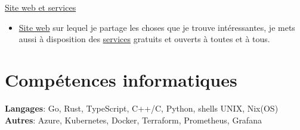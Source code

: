 \documentclass[margin,line]{../res}
\begin{document}
\begin{resume}
	\href{https://github.com/theobori-cafe}{Site web et services}
	\begin{itemize}
		\item \href{https://theobori.cafe}{Site web} sur lequel je partage les choses que je trouve intéressantes, je mets aussi à disposition des \href{https://services.theobori.cafe}{services} gratuits et ouverts à toutes et à tous.
	\end{itemize}

	\section{\sc Compétences informatiques}
	\textbf{Langages}: Go, Rust, TypeScript, C++/C, Python, shells UNIX, Nix(OS)\\
	\textbf{Autres}: Azure, Kubernetes, Docker, Terraform, Prometheus, Grafana

\end{resume}
\end{document}
